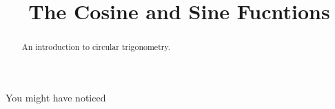 \documentclass{ximera}
\title{The Cosine and Sine Fucntions}
\begin{document}
\begin{abstract}
An introduction to circular trigonometry.
\end{abstract}
\maketitle

You might have noticed
\end{document}
